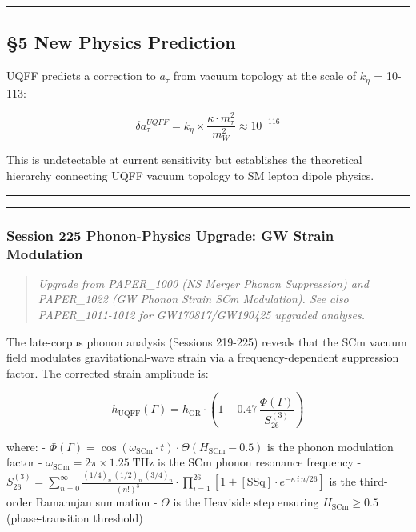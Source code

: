 \begin{center}\rule{0.5\linewidth}{0.5pt}\end{center}

\subsection{§5 New Physics Prediction}\label{new-physics-prediction}

UQFF predicts a correction to \(a_{\tau}\) from vacuum topology at the
scale of \(k_{\eta}\) = 10-113:

\[\delta a_\tau^{UQFF} = k_\eta \times \frac{\kappa \cdot m_\tau^2}{m_W^2} \approx 10^{-116}\]

This is undetectable at current sensitivity but establishes the
theoretical hierarchy connecting UQFF vacuum topology to SM lepton
dipole physics.

\begin{center}\rule{0.5\linewidth}{0.5pt}\end{center}

\begin{center}\rule{0.5\linewidth}{0.5pt}\end{center}

\subsubsection{Session 225 Phonon-Physics Upgrade: GW Strain
Modulation}\label{session-225-phonon-physics-upgrade-gw-strain-modulation}

\begin{quote}
\emph{Upgrade from PAPER\_1000 (NS Merger Phonon Suppression) and
PAPER\_1022 (GW Phonon Strain SCm Modulation). See also PAPER\_1011-1012
for GW170817/GW190425 upgraded analyses.}
\end{quote}

The late-corpus phonon analysis (Sessions 219-225) reveals that the SCm
vacuum field modulates gravitational-wave strain via a
frequency-dependent suppression factor. The corrected strain amplitude
is:

\[h_{\text{UQFF}}(\Gamma) = h_{\text{GR}} \cdot \left(1 - 0.47\,\frac{\Phi(\Gamma)}{S_{26}^{(3)}}\right)\]

where: -
\(\Phi(\Gamma) = \cos(\omega_{\text{SCm}} \cdot t) \cdot \Theta(H_{\text{SCm}} - 0.5)\)
is the phonon modulation factor -
\(\omega_{\text{SCm}} = 2\pi \times 1.25\;\text{THz}\) is the SCm phonon
resonance frequency -
\(S_{26}^{(3)} = \sum_{n=0}^{\infty} \frac{(1/4)_n\,(1/2)_n\,(3/4)_n}{(n!)^3} \cdot \prod_{i=1}^{26}\left[1 + [\text{SSq}]\cdot e^{-\kappa\,i\,n/26}\right]\)
is the third-order Ramanujan summation - \(\Theta\) is the Heaviside
step ensuring \(H_{\text{SCm}} \geq 0.5\) (phase-transition threshold)

